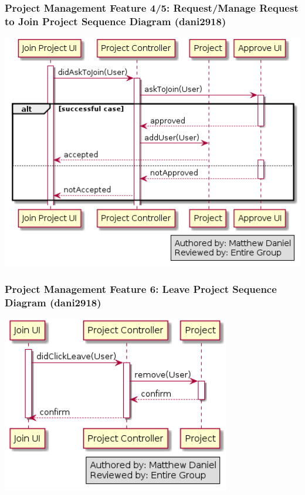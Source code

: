 \documentclass[twoside,letterpaper]{article}
\begin{document}
	\newpage
	
	\subsubsection[Project Management Feature 4/5: Request/Manage Request to Join Project Sequence Diagram  (dani2918)]{\rmfamily\bfseries\color{black}
		Project Management Feature 4/5: Request/Manage Request to Join Project Sequence Diagram (dani2918)}
	
	\bigskip
	
	\includegraphics[width=6.0in]{images/SequenceDiagrams/PMJoinProject}
	\label{pm:sd6}
	
	\newpage
	
	\subsubsection[Project Management Feature 6: Leave Project Sequence Diagram (dani2918)]{\rmfamily\bfseries\color{black}
		Project Management Feature 6: Leave Project Sequence Diagram  (dani2918)}
		\label{pm:sd7}
	
	\bigskip
	
	\includegraphics[width=10cm]{images/SequenceDiagrams/PMLeaveProject}
	
\end{document}
